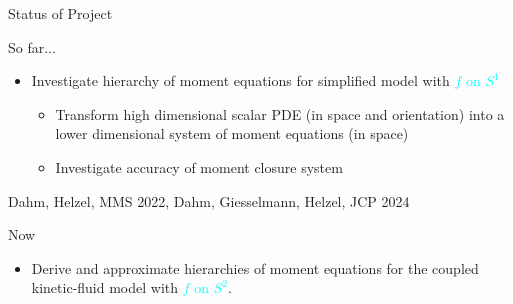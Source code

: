 \begin{frame}{Status of Project}
	\scriptsize
    \begin{block}{So far...}
    	\begin{itemize}
    		\item  Investigate hierarchy of moment equations for simplified model with \textcolor{cyan}{$f$ on $S^1$}
    		\begin{itemize}
    		\item <1->  Transform high dimensional scalar PDE (in space and orientation) into a lower dimensional system of moment equations (in
    		space)
    	   \item <2-> Investigate accuracy of moment closure system
    	    \end{itemize}
    	\end{itemize}
       	   Dahm, Helzel, MMS 2022, Dahm, Giesselmann, Helzel, JCP 2024
    \end{block}
	\begin{block}{Now}
		\begin{itemize}
			\item <3-> Derive and approximate hierarchies of moment equations for the coupled kinetic-fluid model with \textcolor{cyan}{$f$ on $S^2$}.
		\end{itemize}
	\end{block}
\end{frame}
